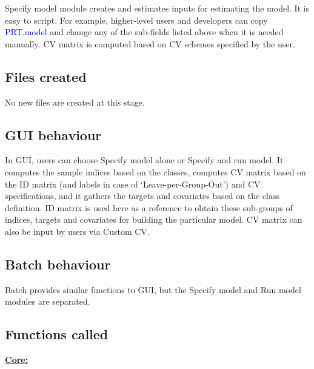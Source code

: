Specify model module creates and estimates inputs for estimating the model. It is easy to script. For example, higher-level users and developers can copy \textcolor{blue}{PRT.model} and change any of the sub-fields listed above when it is needed manually. CV matrix is computed based on CV schemes specified by the user.


\subsection{Files created}

No new files are created at this stage.



\subsection{GUI behaviour}

In GUI, users can choose Specify model alone or Specify and run model. It computes the sample indices based on the classes, computes CV matrix based on the ID matrix (and labels in case of `Leave-per-Group-Out') and CV specifications, and it gathers the targets and covariates based on the class definition. ID matrix is used here as a reference to obtain these sub-groups of indices, targets and covariates for building the particular model. CV matrix can also be input by users via Custom CV.



\subsection{Batch behaviour}

Batch provides similar functions to GUI, but the Specify model and Run model modules are separated.


\subsection{Functions called}

\textbf{\underline{Core:}}

